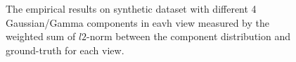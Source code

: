 \documentclass[11pt]{article}
\begin{document}
\begin{figure}
\caption{The empirical results on synthetic dataset with different 4 Gaussian/Gamma components in eavh view measured by the weighted sum of $l2$-norm between the component distribution and ground-truth for each view.}
\end{figure}
\end{document}
